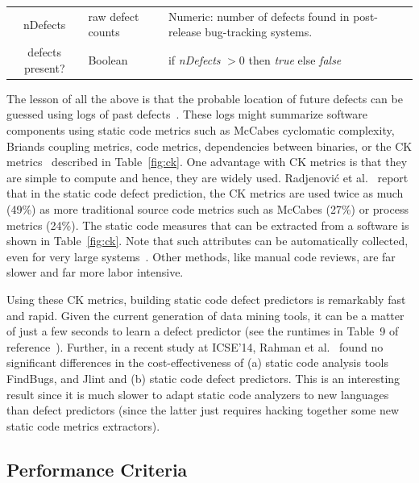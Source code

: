 \documentclass[sigconf,review, anonymous]{acmart}
\theoremstyle{break}
\theoremstyle{break}
\begin{document}
\begin{table}[!t]
\begin{center}
{\begin{tabular}{c|l|p{4.4in}}
nDefects & raw defect counts & Numeric: number of defects found in post-release bug-tracking systems.\\
\rowcolor{lightgray}
defects present? & Boolean& if {\em nDefects} $>0$ then {\em true} else {\em false}
\end{tabular}
}
\end{center}
\vspace{-0.2cm}
\end{table}



The lesson of all the above  is that the probable location
of future defects can be guessed using   logs of past defects~\cite{hall2012systematic, catal2009systematic}. These logs might
summarize software components using
static code metrics such as 
McCabes  cyclomatic  complexity, Briands coupling metrics, code metrics,  
dependencies between  binaries, or
the  CK  metrics~\cite{chidamber1994metrics} described in  Table~\ref{fig:ck}. 
One advantage with CK metrics is that they are  simple  to  compute and hence,
they are widely used. Radjenovi{\'c} et al.~\cite{radjenovic2013software} report that in
the static code defect prediction, the CK metrics are
used  twice as much (49\%) 
as more traditional source code metrics such as McCabes (27\%) or process metrics (24\%).
The static code measures that can be extracted from a software is shown in   Table~\ref{fig:ck}. Note that such
attributes  can be automatically
collected, even for very large systems~\cite{nagappan2005static}. Other methods,
like manual code reviews, are far slower and far more labor intensive. 

Using these CK metrics, building static code defect predictors is remarkably fast and rapid.
Given the current generation of data mining tools, it can be a matter
of just a few seconds to learn a defect predictor (see the runtimes in Table~9 of reference~\cite{fu2016tuning}). Further, in a recent study at ICSE'14, Rahman et
al.~\cite{Rahman14} found no significant differences in the cost-effectiveness
of
(a) static code analysis tools FindBugs, and Jlint and (b) static code defect predictors.
This is an interesting result since it is  much slower to adapt static code
analyzers to new  languages than defect predictors (since the latter just requires hacking together some new
static code metrics extractors).



\subsection{Performance Criteria}
\label{sect:performance}
\end{document}
